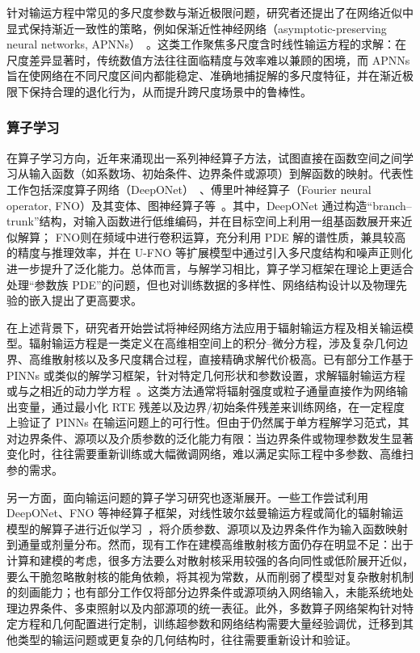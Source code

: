 针对输运方程中常见的多尺度参数与渐近极限问题，研究者还提出了在网络近似中显式保持渐近一致性的策略，例如保渐近性神经网络（asymptotic-preserving neural networks, APNNs）~\cite{jin2023asymptotic, jin2023asymptotic, jin2024asymptotic, bertaglia2022asymptotic}。这类工作聚焦多尺度含时线性输运方程的求解：在尺度差异显著时，传统数值方法往往面临精度与效率难以兼顾的困境，而 APNNs 旨在使网络在不同尺度区间内都能稳定、准确地捕捉解的多尺度特征，并在渐近极限下保持合理的退化行为，从而提升跨尺度场景中的鲁棒性。

\subsubsection{算子学习}

在算子学习方向，近年来涌现出一系列神经算子方法，试图直接在函数空间之间学习从输入函数（如系数场、初始条件、边界条件或源项）到解函数的映射。代表性工作包括深度算子网络（DeepONet）~\cite{lu2021learning,jin2022mionet,wang2021learning,lu2022multifidelity,zhu2023reliable}、傅里叶神经算子（Fourier neural operator, FNO）及其变体、图神经算子等~\cite{li2020fourier,wen2022u,li2023fourier,guibas2021adaptive, tran2021factorized}。其中，DeepONet 通过构造“branch–trunk”结构，对输入函数进行低维编码，并在目标空间上利用一组基函数展开来近似解算； FNO则在频域中进行卷积运算，充分利用 PDE 解的谱性质，兼具较高的精度与推理效率，并在 U-FNO 等扩展模型中通过引入多尺度结构和噪声正则化进一步提升了泛化能力。总体而言，与解学习相比，算子学习框架在理论上更适合处理“参数族 PDE”的问题，但也对训练数据的多样性、网络结构设计以及物理先验的嵌入提出了更高要求。

在上述背景下，研究者开始尝试将神经网络方法应用于辐射输运方程及相关输运模型。辐射输运方程是一类定义在高维相空间上的积分–微分方程，涉及复杂几何边界、高维散射核以及多尺度耦合过程，直接精确求解代价极高。已有部分工作基于 PINNs 或类似的解学习框架，针对特定几何形状和参数设置，求解辐射输运方程或与之相近的动力学方程~\cite{fan2019solving}。这类方法通常将辐射强度或粒子通量直接作为网络输出变量，通过最小化 RTE 残差以及边界/初始条件残差来训练网络，在一定程度上验证了 PINNs 在输运问题上的可行性。但由于仍然属于单方程解学习范式，其对边界条件、源项以及介质参数的泛化能力有限：当边界条件或物理参数发生显著变化时，往往需要重新训练或大幅微调网络，难以满足实际工程中多参数、高维扫参的需求。

另一方面，面向输运问题的算子学习研究也逐渐展开。一些工作尝试利用 DeepONet、FNO 等神经算子框架，对线性玻尔兹曼输运方程或简化的辐射输运模型的解算子进行近似学习~\cite{zhang2025ap,chen2021solving}，将介质参数、源项以及边界条件作为输入函数映射到通量或剂量分布。然而，现有工作在建模高维散射核方面仍存在明显不足：出于计算和建模的考虑，很多方法要么对散射核采用较强的各向同性或低阶展开近似，要么干脆忽略散射核的能角依赖，将其视为常数，从而削弱了模型对复杂散射机制的刻画能力；也有部分工作仅将部分边界条件或源项纳入网络输入，未能系统地处理边界条件、多束照射以及内部源项的统一表征。此外，多数算子网络架构针对特定方程和几何配置进行定制，训练超参数和网络结构需要大量经验调优，迁移到其他类型的输运问题或更复杂的几何结构时，往往需要重新设计和验证。

